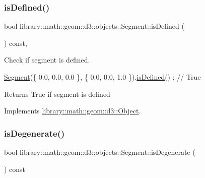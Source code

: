 \subsubsection{\texorpdfstring{is\+Defined()}{isDefined()}}
{\footnotesize\ttfamily bool library\+::math\+::geom\+::d3\+::objects\+::\+Segment\+::is\+Defined (\begin{DoxyParamCaption}{ }\end{DoxyParamCaption}) const\hspace{0.3cm}{\ttfamily [override]}, {\ttfamily [virtual]}}



Check if segment is defined. 


\begin{DoxyCode}
\hyperlink{classlibrary_1_1math_1_1geom_1_1d3_1_1objects_1_1_segment_a5562342d1edf2f52e37ce1bc138ee7d7}{Segment}(\{ 0.0, 0.0, 0.0 \}, \{ 0.0, 0.0, 1.0 \}).\hyperlink{classlibrary_1_1math_1_1geom_1_1d3_1_1objects_1_1_segment_a70a29c3822e4859a2e8cd4a52e1b26f5}{isDefined}() ; \textcolor{comment}{// True}
\end{DoxyCode}


\begin{DoxyReturn}{Returns}
True if segment is defined 
\end{DoxyReturn}


Implements \hyperlink{classlibrary_1_1math_1_1geom_1_1d3_1_1_object_a2216442e322f0c3ca5f01a4efa22baf7}{library\+::math\+::geom\+::d3\+::\+Object}.

\mbox{\label{classlibrary_1_1math_1_1geom_1_1d3_1_1objects_1_1_segment_a11324bd27db3ef9d931fdee763246759}} 
\subsubsection{\texorpdfstring{is\+Degenerate()}{isDegenerate()}}
{\footnotesize\ttfamily bool library\+::math\+::geom\+::d3\+::objects\+::\+Segment\+::is\+Degenerate (\begin{DoxyParamCaption}{ }\end{DoxyParamCaption}) const}



